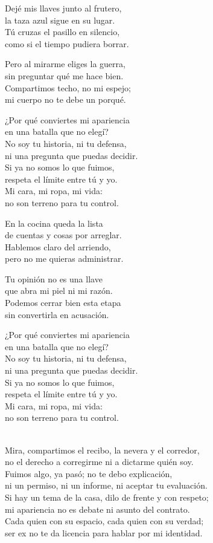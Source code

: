 \begin{lyrics}
Dejé mis llaves junto al frutero,\\
la taza azul sigue en su lugar.\\
Tú cruzas el pasillo en silencio,\\
como si el tiempo pudiera borrar.

Pero al mirarme eliges la guerra,\\
sin preguntar qué me hace bien.\\
Compartimos techo, no mi espejo;\\
mi cuerpo no te debe un porqué.

¿Por qué conviertes mi apariencia\\
en una batalla que no elegí?\\
No soy tu historia, ni tu defensa,\\
ni una pregunta que puedas decidir.\\
Si ya no somos lo que fuimos,\\
respeta el límite entre tú y yo.\\
Mi cara, mi ropa, mi vida:\\
no son terreno para tu control.

En la cocina queda la lista\\
de cuentas y cosas por arreglar.\\
Hablemos claro del arriendo,\\
pero no me quieras administrar.

Tu opinión no es una llave\\
que abra mi piel ni mi razón.\\
Podemos cerrar bien esta etapa\\
sin convertirla en acusación.

¿Por qué conviertes mi apariencia\\
en una batalla que no elegí?\\
No soy tu historia, ni tu defensa,\\
ni una pregunta que puedas decidir.\\
Si ya no somos lo que fuimos,\\
respeta el límite entre tú y yo.\\
Mi cara, mi ropa, mi vida:\\
no son terreno para tu control.

\\
Mira, compartimos el recibo, la nevera y el corredor,\\
no el derecho a corregirme ni a dictarme quién soy.\\
Fuimos algo, ya pasó; no te debo explicación,\\
ni un permiso, ni un informe, ni aceptar tu evaluación.\\
Si hay un tema de la casa, dilo de frente y con respeto;\\
mi apariencia no es debate ni asunto del contrato.\\
Cada quien con su espacio, cada quien con su verdad;\\
ser ex no te da licencia para hablar por mi identidad.


\end{lyrics}
